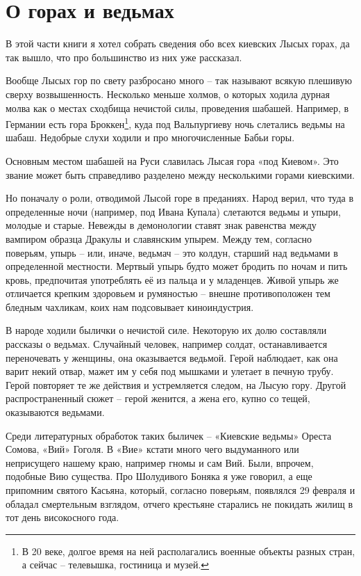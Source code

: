 \chapter{О горах и ведьмах}

В этой части книги я хотел собрать сведения обо всех киевских Лысых горах, да так вышло, что про большинство из них уже рассказал.

Вообще Лысых гор по свету разбросано много – так называют всякую плешивую сверху возвышенность. Неско\-лько меньше холмов, о которых ходила дурная молва как о местах сходбища нечистой силы, проведения шабашей. Например, в Германии есть гора Броккен\footnote{В 20 веке, долгое время на ней располагались военные объекты разных стран, а сейчас – телевышка, гостиница и музей.}, куда под Вальпургиеву ночь слетались ведьмы на шабаш.  Недобрые слухи ходили и про многочисленные Бабьи горы.


Основным местом шабашей на Руси славилась Лысая гора «под Киевом». Это звание может быть справедливо разделено между несколькими горами киевскими.

Но поначалу о роли, отводимой Лысой горе в преданиях. Народ верил, что туда в определенные ночи (например, под Ивана Купала) слетаются ведьмы и упыри, молодые и старые. Невежды в демонологии ставят знак равенства между вампиром образца Дракулы и славянским упырем. Между тем, согласно поверьям, упырь – или, иначе, ведьмач – это колдун, старший над ведьмами в определенной местности. Мертвый упырь будто может бродить по ночам и пить кровь, предпочитая употреблять её из пальца и у младенцев. Живой упырь же отличается крепким здоровьем и румяностью – внешне противоположен тем бледным чахликам, коих нам подсовывает киноиндустрия.

В народе ходили былички о нечистой силе. Некоторую их долю составляли рассказы о ведьмах. Случайный человек, например солдат, останавливается переночевать у женщины, она оказывается ведьмой. Герой наблюдает, как она варит некий отвар, мажет им у себя под мышками и улетает в печную трубу. Герой повторяет те же действия и устремляется следом, на Лысую гору. Другой распространенный сюжет – герой женится, а жена его, купно со тещей, оказываются ведьмами.

Среди литературных обработок таких быличек – «Киевские ведьмы» Ореста Сомова, «Вий» Гоголя. В «Вие» кстати много чего выдуманного или неприсущего нашему краю, например гномы и сам Вий. Были, впрочем, подобные Вию существа. Про Шолудивого Боняка я уже говорил, а еще припомним святого Касьяна, который, согласно поверьям, появлялся 29 февраля и обладал смертельным взглядом, отчего крестьяне старались не покидать жилищ в тот день високосного года.

